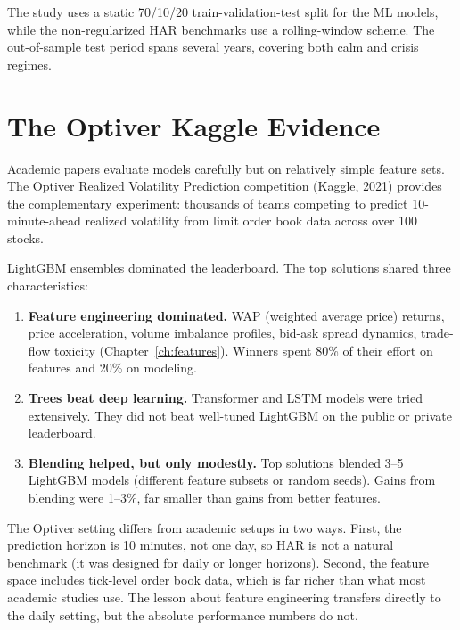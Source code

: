 The study uses a static 70/10/20 train-validation-test split for the ML
models, while the non-regularized HAR benchmarks use a rolling-window
scheme.  The out-of-sample test period spans several years, covering both
calm and crisis regimes.


\section{The Optiver Kaggle Evidence}\label{sec:trees:optiver}

Academic papers evaluate models carefully but on relatively simple feature
sets.  The Optiver Realized Volatility Prediction competition (Kaggle, 2021)
provides the complementary experiment: thousands of teams competing to
predict 10-minute-ahead realized volatility from limit order book data
across over 100 stocks.

\begin{keyresult}
LightGBM ensembles dominated the leaderboard.  The top solutions shared
three characteristics:
\begin{enumerate}[leftmargin=1.8em]
\item \textbf{Feature engineering dominated.}
  WAP (weighted average price) returns, price acceleration, volume
  imbalance profiles, bid-ask spread dynamics, trade-flow toxicity
  (Chapter~\ref{ch:features}).  Winners spent 80\% of their effort on
  features and 20\% on modeling.

\item \textbf{Trees beat deep learning.}
  Transformer and LSTM models were tried extensively.  They did not
  beat well-tuned LightGBM on the public or private leaderboard.

\item \textbf{Blending helped, but only modestly.}
  Top solutions blended 3--5 LightGBM models (different feature subsets or
  random seeds).  Gains from blending were 1--3\%, far smaller than gains
  from better features.
\end{enumerate}
\end{keyresult}

The Optiver setting differs from academic setups in two ways.  First, the
prediction horizon is 10 minutes, not one day, so HAR is not a natural
benchmark (it was designed for daily or longer horizons).  Second, the
feature space includes tick-level order book data, which is far richer than
what most academic studies use.  The lesson about feature engineering
transfers directly to the daily setting, but the absolute performance
numbers do not.


